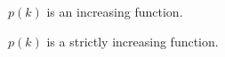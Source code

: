 \documentclass{ximera}
\begin{document}
\begin{exercise}
\begin{question} 



$p(k)$ is an increasing function.
\begin{multipleChoice}
\end{multipleChoice}

\end{question}





\begin{question} 



$p(k)$ is a strictly increasing function.
\begin{multipleChoice}
\end{multipleChoice}

\end{question}






\end{exercise}
\end{document}
